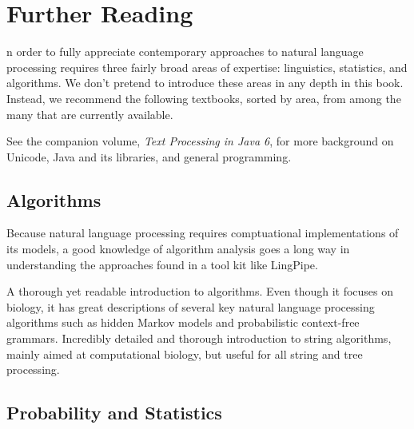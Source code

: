 \chapter{Further Reading}\label{appendix:reading}

n order to fully appreciate contemporary approaches to natural language
processing requires three fairly broad areas of expertise:
linguistics, statistics, and algorithms.  We don't pretend to
introduce these areas in any depth in this book.  Instead, we
recommend the following textbooks, sorted by area, from among the many
that are currently available.

See the companion volume, {\it Text Processing in Java 6}, for 
more background on Unicode, Java and its libraries, and general
programming.


\section{Algorithms}

\noindent
Because natural language processing requires comptuational
implementations of its models, a good knowledge of algorithm analysis
goes a long way in understanding the approaches found in a tool kit
like LingPipe.

\begin{itemize}
%
{A thorough yet readable introduction to algorithms.}
%
{Even though it focuses on biology, it has great
descriptions of several key natural language processing algorithms
such as hidden Markov models and probabilistic context-free grammars.}
%
{Incredibly detailed and thorough introduction to
string algorithms, mainly aimed at computational biology, but
useful for all string and tree processing.}
%
\end{itemize}






\section{Probability and Statistics}

